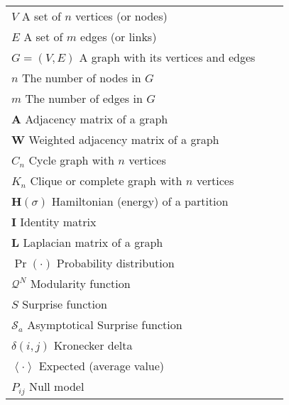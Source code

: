 \begin{longtable}{@{}*{3}{p{\textwidth}@{}}}
$V$ \quad {\color{gray!50}\hrulefill} \quad  A set of $n$ vertices (or nodes) \\
$E$ \quad {\color{gray!50}\hrulefill} \quad  A set of $m$ edges (or links) \\
$G=(V,E)$ \quad {\color{gray!50}\hrulefill} \quad  A graph with its vertices and edges \\
$n$ \quad {\color{gray!50}\hrulefill} \quad  The number of nodes in $G$ \\
$m$ \quad {\color{gray!50}\hrulefill} \quad  The number of edges in $G$ \\
$\mathbf{A}$ \quad {\color{gray!50}\hrulefill} \quad  Adjacency matrix of a graph \\
$\mathbf{W}$ \quad {\color{gray!50}\hrulefill} \quad  Weighted adjacency matrix of a graph \\
$C_n$ \quad {\color{gray!50}\hrulefill} \quad  Cycle graph with $n$ vertices \\
$K_n$ \quad {\color{gray!50}\hrulefill} \quad  Clique or complete graph with $n$ vertices \\
$\mathbf{H}(\sigma)$ \quad {\color{gray!50}\hrulefill} \quad  Hamiltonian (energy) of a partition \\
$\mathbf{I}$ \quad {\color{gray!50}\hrulefill} \quad  Identity matrix \\
$\mathbf{L}$ \quad {\color{gray!50}\hrulefill} \quad  Laplacian matrix of a graph \\
$\Pr(\cdot)$ \quad {\color{gray!50}\hrulefill} \quad  Probability distribution \\
$\mathcal{Q}^N$ \quad {\color{gray!50}\hrulefill} \quad  Modularity function \\
$S$ \quad {\color{gray!50}\hrulefill} \quad  Surprise function \\
$\mathcal{S}_a$ \quad {\color{gray!50}\hrulefill} \quad  Asymptotical Surprise function \\
$\delta(i,j)$ \quad {\color{gray!50}\hrulefill} \quad  Kronecker delta \\
$\left<\cdot \right>$ \quad {\color{gray!50}\hrulefill} \quad  Expected (average value) \\
$P_{ij}$ \quad {\color{gray!50}\hrulefill} \quad  Null model \\

\end{longtable}
